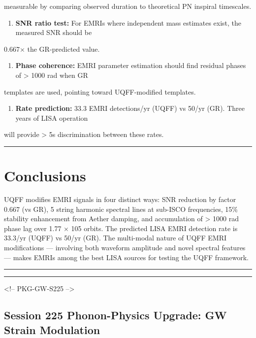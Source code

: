 \documentclass[12pt,a4paper]{article}
\begin{document}
measurable by comparing observed duration to theoretical PN inspiral timescales.

\begin{enumerate}
  \item \textbf{SNR ratio test:} For EMRIs where independent mass estimates exist, the measured SNR should be
\end{enumerate}

0.667$\times$ the GR-predicted value.

\begin{enumerate}
  \item \textbf{Phase coherence:} EMRI parameter estimation should find residual phases of > 1000 rad when GR
\end{enumerate}

templates are used, pointing toward UQFF-modified templates.

\begin{enumerate}
  \item \textbf{Rate prediction:} 33.3 EMRI detections/yr (UQFF) vs 50/yr (GR). Three years of LISA operation
\end{enumerate}

will provide > 5s discrimination between these rates.

\medskip\hrule\medskip

\section{Conclusions}

UQFF modifies EMRI signals in four distinct ways: SNR reduction by factor 0.667 (vs GR), 5 string harmonic spectral lines at sub-ISCO frequencies, 15\% stability enhancement from Aether damping, and accumulation of > 1000 rad phase lag over 1.77 $\times$ 105 orbits. The predicted LISA EMRI detection rate is 33.3/yr (UQFF) vs 50/yr (GR). The multi-modal nature of UQFF EMRI modifications --- involving both waveform amplitude and novel spectral features --- makes EMRIs among the best LISA sources for testing the UQFF framework.

\medskip\hrule\medskip

\medskip\hrule\medskip

<!-- PKG-GW-S225 -->

\subsection{Session 225 Phonon-Physics Upgrade: GW Strain Modulation}
\end{document}
